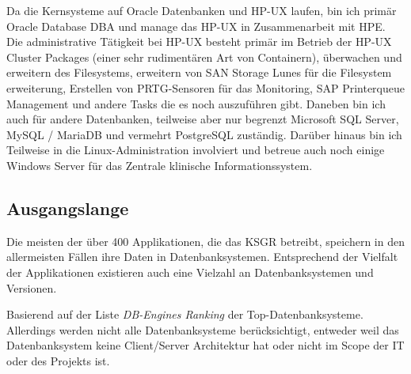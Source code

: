 \begin{flushleft}
    Da die Kernsysteme auf Oracle Datenbanken und \Gls{HP-UX} laufen, bin ich primär \Gls{Oracle Database} DBA und manage das \Gls{HP-UX} in Zusammenarbeit mit HPE.
    Die administrative Tätigkeit bei \Gls{HP-UX} besteht primär im Betrieb der \Gls{HP-UX} Cluster Packages (einer sehr
    rudimentären Art von Containern), überwachen und erweitern des Filesystems, erweitern von \Gls{SAN} Storage Lunes für die Filesystem erweiterung, Erstellen von \Gls{PRTG}-Sensoren für
    das Monitoring, SAP Printerqueue Management und andere Tasks die es noch auszuführen gibt.
    Daneben bin ich auch für andere Datenbanken, teilweise aber nur begrenzt \Gls{Microsoft SQL Server}, \Gls{MySQL} /
    \Gls{MariaDB} und vermehrt \Gls{PostgreSQL} zuständig.
    Darüber hinaus bin ich Teilweise in die \Gls{Linux}-Administration involviert und betreue auch noch einige Windows Server für das Zentrale klinische Informationssystem.
\end{flushleft}
\begin{flushleft}
    \subsection{Ausgangslange}
    Die meisten der über 400 Applikationen, die das KSGR betreibt, speichern in den allermeisten Fällen ihre Daten in Datenbanksystemen.
    Entsprechend der Vielfalt der Applikationen existieren auch eine Vielzahl an Datenbanksystemen und Versionen.
\end{flushleft}
\begin{flushleft}
    Basierend auf der Liste \textit{DB-Engines Ranking}\cite{TTVGIG2P} der Top-Datenbanksysteme.
    Allerdings werden nicht alle Datenbanksysteme berücksichtigt, entweder weil das Datenbanksystem keine Client/Server Architektur hat oder nicht im Scope der IT oder des Projekts ist.
\end{flushleft}
\clearpage
{}
\recalctypearea
